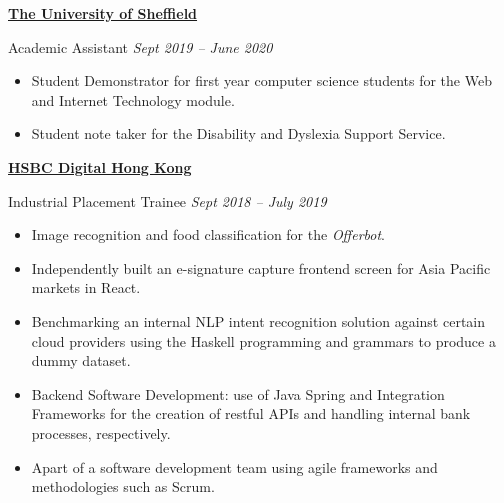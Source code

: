 \documentclass[10pt]{article} %
\begin{document}
\begin{changemargin}{0pt}{0.5pt}
\begin{minipage}[t]{0.5\textwidth}
\begin{changemargin}{5pt}{5pt}

\vspace{5pt}
\underline{\textbf{The University of Sheffield}}\\
\par
\vspace{-10pt}
Academic Assistant \hfill \textit{Sept 2019 -- June 2020}\\
\vspace{-10pt}

\begin{itemize} \itemsep-2pt %
  \item Student Demonstrator for first year computer science students for the Web and Internet Technology module.
  \item Student note taker for the Disability and Dyslexia Support Service.
\end{itemize}


\vspace{5pt}
\underline{\textbf{HSBC Digital Hong Kong}}\\
\par
\vspace{-10pt}
 Industrial Placement Trainee \textit{\hfill Sept 2018 -- July 2019} \\
\vspace{-10pt}

\begin{itemize} \itemsep-2pt %
  \item Image recognition and  food classification for the \textit{Offerbot}.
  \item Independently built an e-signature capture frontend screen for Asia Pacific markets in React.
  \item Benchmarking an internal NLP intent recognition solution against certain cloud providers using the Haskell programming and grammars to produce a dummy dataset.
  \item Backend Software Development: use of Java Spring and Integration Frameworks for the creation of restful APIs and handling internal bank processes, respectively.
  \item Apart of a software development team using agile frameworks and methodologies such as Scrum.
\end{itemize}


\end{changemargin}
\end{minipage}
\end{changemargin}
\end{document}
